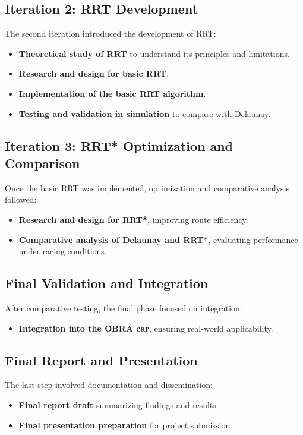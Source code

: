 \documentclass[a4paper,11pt]{report}
\begin{document}
\subsection{Iteration 2: RRT Development}
The second iteration introduced the development of RRT:
\begin{itemize}
    \item \textbf{Theoretical study of RRT} to understand its principles and limitations.
    \item \textbf{Research and design for basic RRT}.
    \item \textbf{Implementation of the basic RRT algorithm}.
    \item \textbf{Testing and validation in simulation} to compare with Delaunay.
\end{itemize}

\subsection{Iteration 3: RRT* Optimization and Comparison}
Once the basic RRT was implemented, optimization and comparative analysis followed:
\begin{itemize}
    \item \textbf{Research and design for RRT*}, improving route efficiency.
    \item \textbf{Comparative analysis of Delaunay and RRT*}, evaluating performance under racing conditions.
\end{itemize}

\subsection{Final Validation and Integration}
After comparative testing, the final phase focused on integration:
\begin{itemize}
    \item \textbf{Integration into the OBRA car}, ensuring real-world applicability.
\end{itemize}

\subsection{Final Report and Presentation}
The last step involved documentation and dissemination:
\begin{itemize}
    \item \textbf{Final report draft} summarizing findings and results.
    \item \textbf{Final presentation preparation} for project submission.
\end{itemize}
\end{document}
